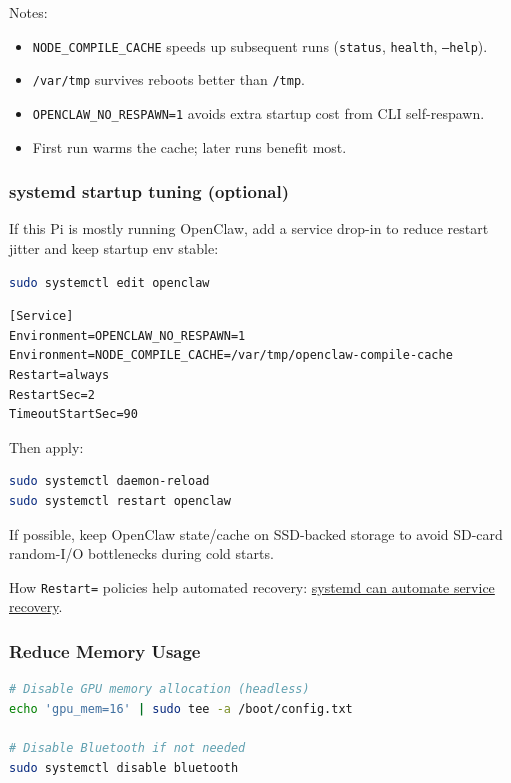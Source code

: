 Notes:

\begin{itemize}
  \item \texttt{NODE\_COMPILE\_CACHE} speeds up subsequent runs (\texttt{status}, \texttt{health}, \texttt{--help}).
  \item \texttt{/var/tmp} survives reboots better than \texttt{/tmp}.
  \item \texttt{OPENCLAW\_NO\_RESPAWN=1} avoids extra startup cost from CLI self-respawn.
  \item First run warms the cache; later runs benefit most.
\end{itemize}


\subsubsection{systemd startup tuning (optional)}


If this Pi is mostly running OpenClaw, add a service drop-in to reduce restart
jitter and keep startup env stable:

\begin{lstlisting}[language=bash]
sudo systemctl edit openclaw
\end{lstlisting}


\begin{lstlisting}
[Service]
Environment=OPENCLAW_NO_RESPAWN=1
Environment=NODE_COMPILE_CACHE=/var/tmp/openclaw-compile-cache
Restart=always
RestartSec=2
TimeoutStartSec=90
\end{lstlisting}


Then apply:

\begin{lstlisting}[language=bash]
sudo systemctl daemon-reload
sudo systemctl restart openclaw
\end{lstlisting}


If possible, keep OpenClaw state/cache on SSD-backed storage to avoid SD-card
random-I/O bottlenecks during cold starts.

How \texttt{Restart=} policies help automated recovery:
\href{https://www.redhat.com/en/blog/systemd-automate-recovery}{systemd can automate service recovery}.

\subsubsection{Reduce Memory Usage}


\begin{lstlisting}[language=bash]
# Disable GPU memory allocation (headless)
echo 'gpu_mem=16' | sudo tee -a /boot/config.txt

# Disable Bluetooth if not needed
sudo systemctl disable bluetooth
\end{lstlisting}


